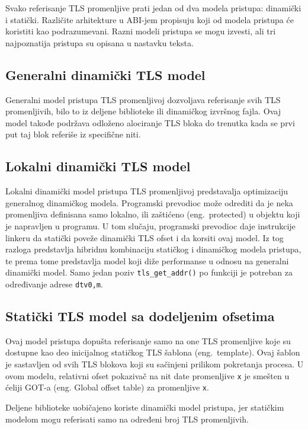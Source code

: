 \documentclass[12pt,oneside]{memoir}
\begin{document}
Svako referisanje TLS promenljive prati jedan od dva modela pristupa: dinamički i statički. Različite arhitekture u ABI-jem propisuju koji od modela pristupa će koristiti kao podrazumevani. Razni modeli pristupa se mogu izvesti, ali tri najpoznatija pristupa su opisana u nastavku teksta.

\subsection{Generalni dinamički TLS model}

Generalni model pristupa TLS promenljivoj dozvoljava referisanje svih TLS promenljivih, bilo to iz deljene biblioteke ili dinamičkog izvršnog fajla. Ovaj model takođe podržava odloženo alociranje TLS bloka do trenutka kada se prvi put taj blok referiše iz specifične niti.

\subsection{Lokalni dinamički TLS model}

Lokalni dinamički model pristupa TLS promenljivoj predstavalja optimizaciju generalnog dinamičkog modela. Programski prevodioc može odrediti da je neka promenljiva definisana samo lokalno, ili zaštićeno (eng.~protected) u objektu koji je napravljen u programu. U tom slučaju, programski prevodioc daje instrukcije linkeru da statički poveže dinamički TLS ofset i da korsiti ovaj model. Iz tog razloga predstavlja hibridnu kombinaciju statičkog i dinamičkog modela pristupa, te prema tome predstavlja model koji diže performanse u odnosu na generalni dinamički model. Samo jedan poziv \texttt{tls\_get\_addr()} po funkciji je potreban za određivanje adrese \texttt{dtv0,m}.

\subsection{Statički TLS model sa dodeljenim ofsetima}

Ovaj model pristupa dopušta referisanje samo na one TLS promenljive koje su dostupne kao deo inicijalnog statičkog TLS šablona (eng.~template). Ovaj šablon je sastavljen od svih TLS blokova koji su sačinjeni prilikom pokretanja procesa. U ovom modelu, relativni ofset pokazivač na nit date promenljive \texttt{x} je smešten u ćeliji GOT-a (eng. Global offset table) za promenljive \texttt{x}.

Deljene biblioteke uobičajeno koriste dinamički model pristupa, jer statičkim modelom mogu referisati samo na određeni broj TLS promenljivih.
\end{document}
